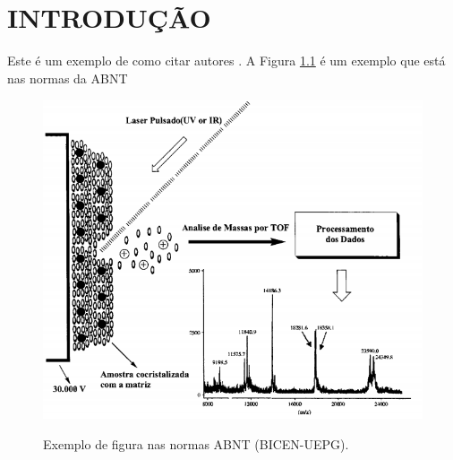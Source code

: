 \chapter{INTRODUÇÃO}

Este é um exemplo de como citar autores
\cite{gibas2001developing}. A Figura \ref{fig:exemplo} é um exemplo que está nas normas da 
 ABNT



\begin{figure}[!ht]
\caption{Exemplo de figura nas normas ABNT (BICEN-UEPG).}
\includegraphics[width=1\textwidth]{imagens/figura1.PNG}
\label{fig:exemplo}
\end{figure}